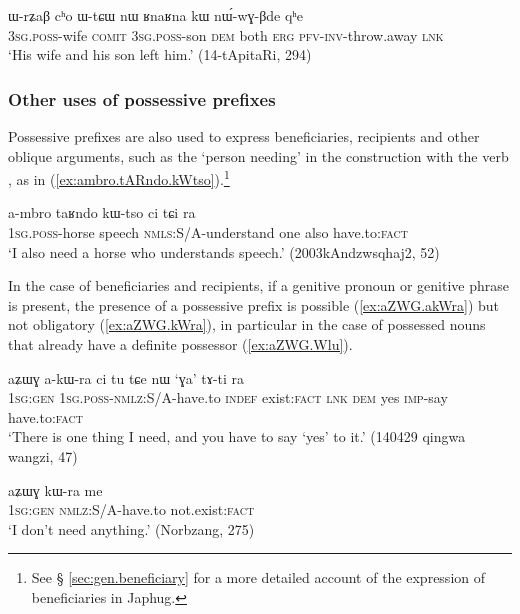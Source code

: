 \begin{exe}
\ex \label{ex:obv.nWwGBde}
\gll
ɯ-rʑaβ cʰo ɯ-tɕɯ nɯ ʁnaʁna kɯ nɯ́-wɣ-βde qʰe \\
\textsc{3sg.poss}-wife \textsc{comit} \textsc{3sg.poss}-son \textsc{dem} both \textsc{erg} \textsc{pfv}-\textsc{inv}-throw.away \textsc{lnk} \\
\glt `His wife and his son left him.' (14-tApitaRi, 294)
\end{exe}

\subsubsection{Other uses of possessive prefixes} \label{sec:other.uses.poss.prefixes}
Possessive prefixes are also used to express beneficiaries, recipients and other oblique arguments, such as the `person needing' in the construction with the verb ,  as in (\ref{ex:ambro.tARndo.kWtso}).\footnote{See § \ref{sec:gen.beneficiary} for a more detailed account of the expression of beneficiaries in Japhug.}

 \begin{exe}
\ex \label{ex:ambro.tARndo.kWtso}
\gll a-mbro taʁndo kɯ-tso ci tɕi ra \\
\textsc{1sg.poss}-horse speech \textsc{nmls}:S/A-understand one also have.to:\textsc{fact} \\
\glt `I also need a horse who understands speech.' (2003kAndzwsqhaj2, 52)
\end{exe}

In the case of beneficiaries and recipients, if a genitive pronoun or genitive phrase is present, the presence of a possessive prefix is possible (\ref{ex:aZWG.akWra}) but not obligatory (\ref{ex:aZWG.kWra}), in particular in the case of possessed nouns that already have a definite possessor (\ref{ex:aZWG.Wlu}).

 \begin{exe}
\ex \label{ex:aZWG.akWra}
\gll aʑɯɣ a-kɯ-ra ci tu tɕe nɯ `ɣa' tɤ-ti ra \\
\textsc{1sg:gen} \textsc{1sg.poss}-\textsc{nmlz}:S/A-have.to \textsc{indef} exist:\textsc{fact} \textsc{lnk} \textsc{dem} yes \textsc{imp}-say have.to:\textsc{fact} \\
\glt `There is one thing I need, and you have to say `yes' to it.' (140429 qingwa wangzi, 47)
\end{exe}

 \begin{exe}
\ex \label{ex:aZWG.kWra}
\gll  aʑɯɣ kɯ-ra me \\
\textsc{1sg:gen} \textsc{nmlz}:S/A-have.to not.exist:\textsc{fact} \\
\glt `I don't need anything.' (Norbzang, 275)
\end{exe}

